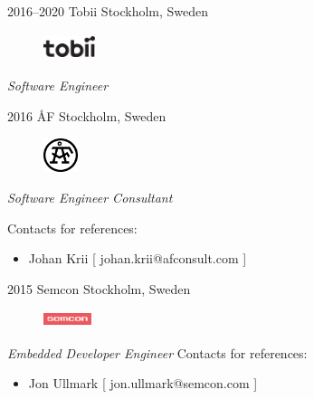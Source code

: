 \documentclass[]{friggeri-cv}
\begin{document}
\begin{entrylist}
\entry
{2016--2020}
{Tobii}
{Stockholm, Sweden}
{
\begin{figure}
	\vspace{-20pt}
	\begin{center}
		\includegraphics[width=1.5cm,height=0.8cm]{tobii}
	\end{center}
\end{figure}
\emph{Software Engineer} \\
}
\end{entrylist}


\begin{entrylist}
\entry
{2016}
{ÅF}
{Stockholm, Sweden}
{
	\begin{figure}
		\vspace{-20pt}
		\begin{center}
			\includegraphics[width=1cm,height=1cm]{af}
		\end{center}
	\end{figure}
	\emph{Software Engineer Consultant}

	Contacts for references:
	\begin{itemize}
		\item Johan Krii [ johan.krii@afconsult.com ]
	\end{itemize}
}
\end{entrylist}


\begin{entrylist}
\entry
{2015}
{Semcon}
{Stockholm, Sweden}
{
	\begin{figure}
		\vspace{-20pt}
		\begin{center}
			\includegraphics[width=1.4cm,height=0.5cm]{semcon}
		\end{center}
	\end{figure}
	\emph{Embedded Developer Engineer}
	Contacts for references:
	\begin{itemize}
		\item Jon Ullmark [ jon.ullmark@semcon.com ]
	\end{itemize}
}
\end{entrylist}
\end{document}

